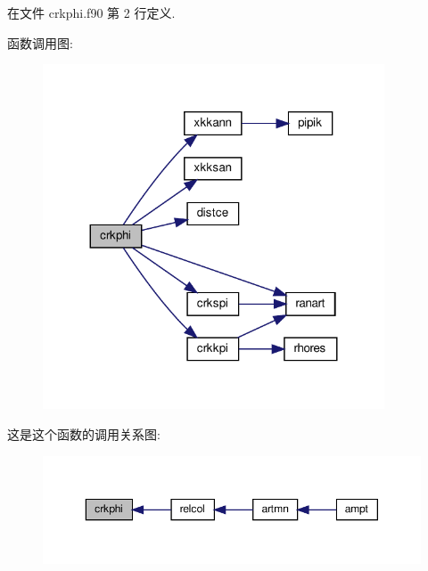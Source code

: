 在文件 crkphi.\+f90 第 2 行定义.

函数调用图\+:
\nopagebreak
\begin{figure}[H]
\begin{center}
\leavevmode
\includegraphics[width=287pt]{crkphi_8f90_aeb60c8b31853478ff05088c42ef409ce_cgraph}
\end{center}
\end{figure}
这是这个函数的调用关系图\+:
\nopagebreak
\begin{figure}[H]
\begin{center}
\leavevmode
\includegraphics[width=350pt]{crkphi_8f90_aeb60c8b31853478ff05088c42ef409ce_icgraph}
\end{center}
\end{figure}
